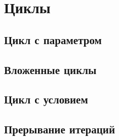 \section{Циклы}

\subsection{Цикл с параметром}

\task

\task

\task

\task

\task

\task

\task

\task

\task

\task

\subsection{Вложенные циклы}

\task

\task

\task

\task

\task

\task

\task

\task

\task

\task

\subsection{Цикл с условием}

\task

\task

\task

\task

\task

\task

\task

\task

\task

\task

\subsection{Прерывание итераций}

\task

\task

\task

\task

\task

\task

\task

\task

\task

\task
